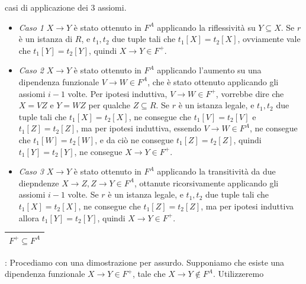 \documentclass[12pt, letterpaper]{article}
\begin{document}
casi di applicazione dei 3 assiomi. \begin{itemize}
    \item \textit{Caso 1} \(X\rightarrow Y\) è stato ottenuto in \(F^A\) applicando la riflessività su \(Y\subseteq X\). 
    Se \(r\) è un istanza di \(R\), e \(t_1,t_2\) due tuple tali che \(t_1[X]=t_2[X]\), ovviamente 
    vale che \(t_1[Y]=t_2[Y]\), quindi \(X\rightarrow Y\in F^+\).
    \item \textit{Caso 2} \(X\rightarrow Y\) è stato ottenuto in \(F^A\) applicando l'aumento su una dipendenza 
    funzionale \(V\rightarrow W\in F^A\), che è stato ottenuto applicando gli assiomi \(i-1\) volte. Per 
    ipotesi induttiva, \(V\rightarrow W\in F^+\), vorrebbe dire che \(X=VZ\) e \(Y=WZ\) per qualche \(Z\subseteq R\).
    Se \(r\) è un istanza legale, e \(t_1,t_2\) due tuple tali che \(t_1[X]=t_2[X]\), ne consegue 
    che \(t_1[V]=t_2[V]\) e  \(t_1[Z]=t_2[Z]\), ma per ipotesi induttiva, essendo \(V\rightarrow W\in F^A\), 
    ne consegue che \(t_1[W]=t_2[W]\), e da ciò ne consegue  \(t_1[Z]=t_2[Z]\), quindi  \(t_1[Y]=t_2[Y]\), ne 
    consegue 
    \(X\rightarrow Y\in F^+\).
    \item \textit{Caso 3} \(X\rightarrow Y\) è stato ottenuto in \(F^A\) applicando la transitività da due 
    diepndenze \(X\rightarrow Z, Z\rightarrow Y \in F^A\), ottanute ricorsivamente applicando gli assiomi 
    \(i-1\) volte. Se \(r\) è un istanza legale, e \(t_1,t_2\) due tuple tali che \(t_1[X]=t_2[X]\), 
    ne consegue che \(t_1[Z]=t_2[Z]\), ma per ipotesi induttiva allora \(t_1[Y]=t_2[Y]\), quindi 
    \(X\rightarrow Y\in F^+\).
\end{itemize}
\begin{tabular}{|c|}\hline \(F^+\subseteq F^A\) \\ \hline\end{tabular}: Procediamo con una dimostrazione per assurdo. 
Supponiamo che esiste una dipendenza funzionale \(X\rightarrow Y \in F^+\), tale che \(X\rightarrow Y \notin F^A\). Utilizzeremo 
\end{document}
